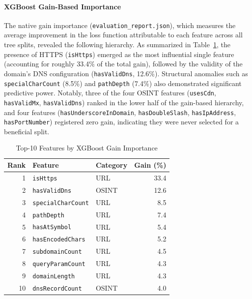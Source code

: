 \paragraph{XGBoost Gain-Based Importance}

The native gain importance (\texttt{evaluation\_report.json}), which
measures the average improvement in the loss function attributable to
each feature across all tree splits, revealed the following hierarchy.
As summarized in Table~\ref{tab:gain_importance}, the presence of HTTPS
(\texttt{isHttps}) emerged as the most influential single feature
(accounting for roughly 33.4\% of the total gain), followed by the
validity of the domain's DNS configuration (\texttt{hasValidDns},
12.6\%). Structural anomalies such as \texttt{specialCharCount} (8.5\%)
and \texttt{pathDepth} (7.4\%) also demonstrated significant predictive
power. Notably, three of the four OSINT features (\texttt{usesCdn},
\texttt{hasValidMx}, \texttt{hasValidDns}) ranked in the lower half of
the gain-based hierarchy, and four features
(\texttt{hasUnderscoreInDomain}, \texttt{hasDoubleSlash},
\texttt{hasIpAddress}, \texttt{hasPortNumber}) registered zero gain,
indicating they were never selected for a beneficial split.

\begin{table}[htbp]
\centering
\caption{Top-10 Features by XGBoost Gain Importance}
\label{tab:gain_importance}
\renewcommand{\arraystretch}{1.2}
\begin{tabular}{@{}rllr@{}}
\toprule
\textbf{Rank} & \textbf{Feature} & \textbf{Category} & \textbf{Gain (\%)} \\
\midrule
1 & \texttt{isHttps} & URL & 33.4 \\
2 & \texttt{hasValidDns} & OSINT & 12.6 \\
3 & \texttt{specialCharCount} & URL & 8.5 \\
4 & \texttt{pathDepth} & URL & 7.4 \\
5 & \texttt{hasAtSymbol} & URL & 5.4 \\
6 & \texttt{hasEncodedChars} & URL & 5.2 \\
7 & \texttt{subdomainCount} & URL & 4.5 \\
8 & \texttt{queryParamCount} & URL & 4.3 \\
9 & \texttt{domainLength} & URL & 4.3 \\
10 & \texttt{dnsRecordCount} & OSINT & 4.0 \\
\bottomrule
\end{tabular}
\end{table}

